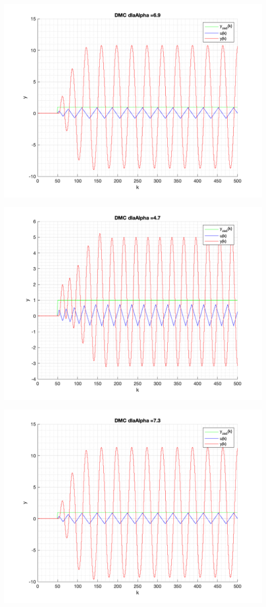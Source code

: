 \documentclass[a4paper, 11pt]{article}
\begin{document}
\begin{enumerate}
 \includegraphics[width=\linewidth]{./ModelsDodatkowe_Alpha/P4_DMC_Alpha_6_9_png.png} 
 
 \includegraphics[width=\linewidth]{./ModelsDodatkowe_Alpha/P4_DMC_Alpha_4_7_png.png} 
 
 \includegraphics[width=\linewidth]{./ModelsDodatkowe_Alpha/P4_DMC_Alpha_7_3_png.png} 
 

\end{enumerate}
\end{document}
